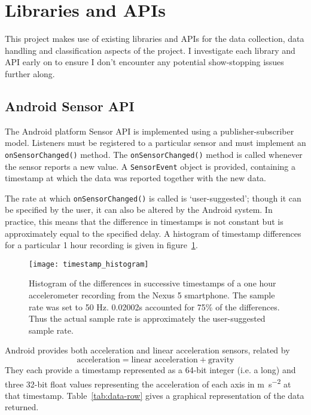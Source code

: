   
  \section{Libraries and APIs}
      This project makes use of existing libraries and APIs for the data collection, data handling
      and classification aspects of the project. I investigate each library and API early on to ensure I don't encounter any potential show-stopping issues further along. 
    
    \subsection{Android Sensor API}
      \label{sec:sensor-api}
      The Android platform Sensor API\cite{androidsensoreventapi} is implemented using a publisher-subscriber model. Listeners must be registered
      to a particular sensor and must implement an \texttt{onSensorChanged()}
      method. The \texttt{onSensorChanged()} method is called whenever the sensor reports a new 
      value. A \texttt{SensorEvent} object is provided, containing a timestamp at which the data was
      reported together with the new data.
      
      The rate at which \texttt{onSensorChanged()} is called is `user-suggested'; though it can be 
      specified by the user, it can also be altered by the Android system. In practice, this means
      that the difference in timestamps is not constant but is approximately equal to the specified 
      delay. A histogram of timestamp differences for a particular 1 hour recording is given in 
      figure~\ref{fig:timestamp-differences}.
      
      \begin{figure}[h]
        \centering
        \texttt{[image: timestamp\_histogram]}
        \caption{Histogram of the differences in successive timestamps of a one hour accelerometer 
            recording from the Nexus 5 smartphone. 
            The sample rate was set to 50 \si{Hz}. 0.02002s accounted for 75\% of the 
            differences.
            Thus the actual sample rate is approximately the user-suggested sample rate.}
        \label{fig:timestamp-differences}
      \end{figure}
      
      Android provides both acceleration and linear acceleration sensors, related by 
      $$\textrm{acceleration} = \textrm{linear acceleration} + \textrm{gravity}$$
      They each provide a timestamp represented as a 64-bit integer (i.e. a long) and three 32-bit float values representing the 
      acceleration of each axis in \si{\metre\per\square\second} at that timestamp.   
      Table~\ref{tab:data-row} gives a graphical representation of the data returned.
      
